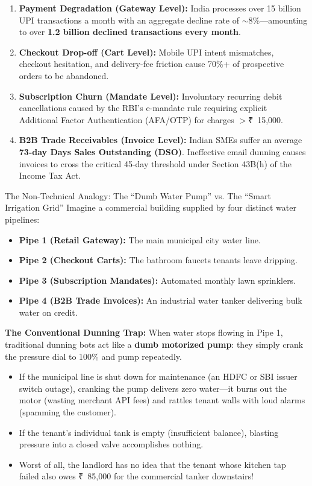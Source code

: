 \documentclass[11pt, a4paper]{article}
\newcommand{\INR}{{\rupeefont ₹}}
\begin{document}
\begin{enumerate}[leftmargin=1.5em, itemsep=4pt]
  \item \textbf{Payment Degradation (Gateway Level):} India processes over 15 billion UPI transactions a month with an aggregate decline rate of $\sim$8\%---amounting to over \textbf{1.2 billion declined transactions every month}.
  \item \textbf{Checkout Drop-off (Cart Level):} Mobile UPI intent mismatches, checkout hesitation, and delivery-fee friction cause 70\%+ of prospective orders to be abandoned.
  \item \textbf{Subscription Churn (Mandate Level):} Involuntary recurring debit cancellations caused by the RBI's e-mandate rule requiring explicit Additional Factor Authentication (AFA/OTP) for charges $>$\INR~15,000.
  \item \textbf{B2B Trade Receivables (Invoice Level):} Indian SMEs suffer an average \textbf{73-day Days Sales Outstanding (DSO)}. Ineffective email dunning causes invoices to cross the critical 45-day threshold under Section 43B(h) of the Income Tax Act.
\end{enumerate}

\begin{calloutbox}{The Non-Technical Analogy: The ``Dumb Water Pump'' vs. The ``Smart Irrigation Grid''}
Imagine a commercial building supplied by four distinct water pipelines:
\begin{itemize}[leftmargin=1.2em, itemsep=2pt]
  \item \textbf{Pipe 1 (Retail Gateway):} The main municipal city water line.
  \item \textbf{Pipe 2 (Checkout Carts):} The bathroom faucets tenants leave dripping.
  \item \textbf{Pipe 3 (Subscription Mandates):} Automated monthly lawn sprinklers.
  \item \textbf{Pipe 4 (B2B Trade Invoices):} An industrial water tanker delivering bulk water on credit.
\end{itemize}

\textbf{The Conventional Dunning Trap:}
When water stops flowing in Pipe 1, traditional dunning bots act like a \textbf{dumb motorized pump}: they simply crank the pressure dial to 100\% and pump repeatedly.
\begin{itemize}[leftmargin=1.2em, itemsep=2pt]
  \item If the municipal line is shut down for maintenance (an HDFC or SBI issuer switch outage), cranking the pump delivers zero water---it burns out the motor (wasting merchant API fees) and rattles tenant walls with loud alarms (spamming the customer).
  \item If the tenant's individual tank is empty (insufficient balance), blasting pressure into a closed valve accomplishes nothing.
  \item Worst of all, the landlord has no idea that the tenant whose kitchen tap failed also owes \INR~85,000 for the commercial tanker downstairs!
\end{itemize}
\end{calloutbox}
\end{document}
